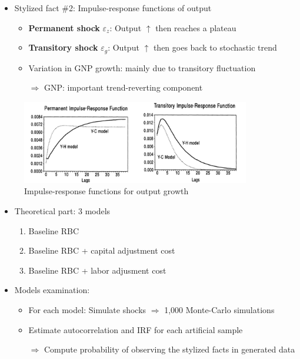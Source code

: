 \documentclass[10pt]{beamer}
\begin{document}
\begin{frame}
    \begin{itemize}
        \setlength\itemsep{1em}
        \item Stylized fact \#2: \alert{Impulse-response functions} of output
              \begin{itemize}
                  \item \textbf{Permanent shock} $\varepsilon_z$: Output $\uparrow$ then reaches a plateau
                  \item \textbf{Transitory shock} $\varepsilon_g$: Output $\uparrow$ then goes back to stochastic trend
                  \item Variation in GNP growth: mainly due to transitory fluctuation
                  \item[$\Rightarrow$] GNP: important \alert{trend-reverting component}
              \end{itemize}
    \end{itemize}
    \begin{figure}
        \centering
        \includegraphics[width=10cm]{figures/sf2.png}
        \caption{Impulse-response functions for output growth}
    \end{figure}
\end{frame}

\begin{frame}
    \begin{itemize}
        \setlength\itemsep{1em}
        \item \alert{Theoretical} part: 3 models
              \begin{enumerate}
                  \item Baseline RBC
                  \item Baseline RBC + capital adjustment cost
                  \item Baseline RBC + labor adjusment cost
              \end{enumerate}
        \item Models examination:
              \begin{itemize}
                  \item For each model: Simulate shocks $\Rightarrow$ 1,000 \alert{Monte-Carlo
                            simulations}
                  \item Estimate autocorrelation and IRF for each artificial sample
                  \item[$\Rightarrow$] Compute \alert{probability of observing the stylized facts} in generated data
              \end{itemize}
    \end{itemize}
\end{frame}
\end{document}
